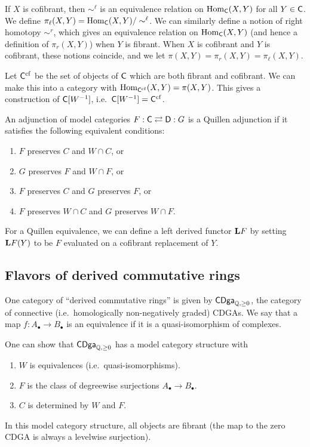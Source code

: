 \documentclass{amsart}
\begin{document}
If $X$ is cofibrant, then $\sim^\ell$ is an equivalence relation on $\operatorname{Hom}_{\mathsf{C}}(X, Y)$ for all $Y \in \mathsf{C}$.
We define $\pi_\ell(X, Y) = \operatorname{Hom}_{\mathsf{C}}(X, Y) / \sim^\ell$.
We can similarly define a notion of right homotopy $\sim^r$, which gives an equivalence relation on $\operatorname{Hom}_{\mathsf{C}}(X, Y)$ (and hence a definition of $\pi_r(X, Y)$) when $Y$ is fibrant.
When $X$ is cofibrant and $Y$ is cofibrant, these notions coincide, and we let $\pi(X, Y) = \pi_r(X, Y) = \pi_\ell(X, Y)$.

Let $\mathsf{C}^{\mathrm{cf}}$ be the set of objects of $\mathsf{C}$ which are both fibrant and cofibrant.
We can make this into a category with $\operatorname{Hom}_{\mathsf{C}^{\mathrm{cf}}}(X, Y) = \pi(X, Y)$.
This gives a construction of $\mathsf{C}[W^{-1}]$, i.e.\ $\mathsf{C}[W^{-1}] = \mathsf{C}^{\mathrm{cf}}$.

\begin{dfn}
	An adjunction of model categories $F: \mathsf{C} \rightleftarrows \mathsf{D} : G$ is a Quillen adjunction if it satisfies the following equivalent conditions:
	\begin{enumerate}
		\item $F$ preserves $C$ and $W \cap C$, or
		\item $G$ preserves $F$ and $W \cap F$, or
		\item $F$ preserves $C$ and $G$ preserves $F$, or
		\item $F$ preserves $W \cap C$ and $G$ preserves $W \cap F$.
	\end{enumerate}
\end{dfn}

For a Quillen equivalence, we can define a left derived functor $\mathbf{L} F$ by setting $\mathbf{L} F(Y)$ to be $F$ evaluated on a cofibrant replacement of $Y$.

\subsection{Flavors of derived commutative rings}

One category of ``derived commutative rings'' is given by $\mathsf{CDga}_{\mathbb{Q},\geq 0}$, the category of connective (i.e.\ homologically non-negatively graded) CDGAs.
We say that a map $f: A_\bullet \to B_\bullet$ is an equivalence if it is a quasi-isomorphism of complexes.

One can show that $\mathsf{CDga}_{\mathbb{Q}, \geq 0}$ has a model category structure with
\begin{enumerate}
	\item $W$ is equivalences (i.e.\ quasi-isomorphisms).
	\item $F$ is the class of degreewise surjections $A_\bullet \to B_\bullet$.
	\item $C$ is determined by $W$ and $F$.
\end{enumerate}
In this model category structure, all objects are fibrant (the map to the zero CDGA is always a levelwise surjection).
\end{document}

